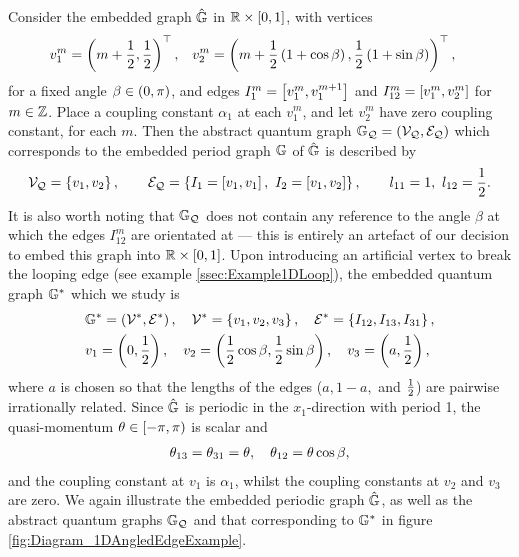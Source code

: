 Consider the embedded graph $\hat{\mathbb{G}}$ in $\mathbb{R}\times\left[ 0,1 \right]$, with vertices
\begin{align*}
	v_1^m = \left( m + \frac{1}{2}, \frac{1}{2} \right)^\top, 
	&\quad v_2^m = \left( m + \frac{1}{2}\left( 1+\cos\beta \right), \frac{1}{2}\left( 1+\sin\beta \right) \right)^\top,
\end{align*}
for a fixed angle $\beta\in\left( 0,\pi \right)$, and edges $I_{1}^{m} = \left[ v_1^m, v_1^{m+1} \right]$ and $I_{12}^m=\left[ v_1^m, v_2^m \right]$ for $m\in\mathbb{Z}$.
Place a coupling constant $\alpha_1$ at each $v_1^m$, and let $v_2^m$ have zero coupling constant, for each $m$.
Then the abstract quantum graph $\mathbb{G}_{\mathcal{Q}}=\left( \mathcal{V}_{\mathcal{Q}}, \mathcal{E}_{\mathcal{Q}} \right)$ which corresponds to the embedded period graph $\mathbb{G}$ of $\hat{\mathbb{G}}$ is described by
\begin{align*}
	\vertSet_{\mathcal{Q}} = \clbracs{v_1, v_2},
	\qquad
	\edgeSet_{\mathcal{Q}} = \clbracs{ I_1=\sqbracs{v_1,v_1}, \ I_2=\sqbracs{v_1,v_2} },
	\qquad
	l_{11} = 1, \ l_{12} = \recip{2}.
\end{align*}
It is also worth noting that $\mathbb{G}_{\mathcal{Q}}$ does not contain any reference to the angle $\beta$ at which the edges $I^m_{12}$ are orientated at --- this is entirely an artefact of our decision to embed this graph into $\mathbb{R}\times\left[ 0,1 \right]$.
Upon introducing an artificial vertex to break the looping edge (see example \ref{ssec:Example1DLoop}), the embedded quantum graph $\mathbb{G}^*$ which we study is
\begin{align*}
	&\mathbb{G}^* = \left( \mathcal{V}^*, \mathcal{E}^* \right), \quad
	\mathcal{V}^* = \left\{  v_1, v_2, v_3  \right\}, \quad
	\mathcal{E}^* = \left\{  I_{12}, I_{13}, I_{31}  \right\}, \\
	&v_1 = \left( 0,\frac{1}{2} \right), \quad
	v_2 = \left( \frac{1}{2}\cos\beta, \frac{1}{2}\sin\beta \right), \quad
	v_3 = \left( a, \frac{1}{2} \right),
\end{align*}
where $a$ is chosen so that the lengths of the edges ($a, 1-a,$ and $\frac{1}{2}$) are pairwise irrationally related.
Since $\hat{\mathbb{G}}$ is periodic in the $x_1$-direction with period 1, the quasi-momentum $\theta\in\left[-\pi,\pi\right)$ is scalar and
\begin{align*}
	\theta_{13} = \theta_{31} = \theta, \quad \theta_{12} = \theta\cos\beta,
\end{align*}
and the coupling constant at $v_1$ is $\alpha_1$, whilst the coupling constants at $v_2$ and $v_3$ are zero.
We again illustrate the embedded periodic graph $\hat{\mathbb{G}}$, as well as the abstract quantum graphs $\mathbb{G}_{\mathcal{Q}}$ and that corresponding to $\mathbb{G}^*$ in figure \ref{fig:Diagram_1DAngledEdgeExample}.

